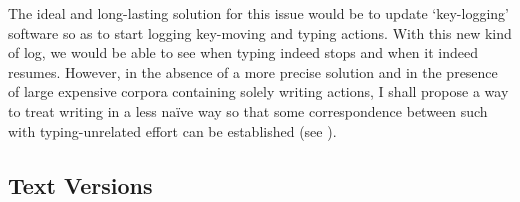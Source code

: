 \documentclass[output=paper]{LSP/langsci}
\begin{document}
The ideal and long-lasting solution for this issue would be to update `key-logging' software so as to start logging key-moving and typing actions. With this new kind of log, we would be able to see when typing indeed stops and when it indeed resumes. However, in the absence of a more precise solution and in the presence of large expensive corpora containing solely writing actions, I shall propose a way to treat writing  in a less naïve way so that some correspondence between such  with typing-unrelated effort can be established (see ).

\subsection{Text Versions}
\label{couto:sec:TextVersions}
\end{document}
